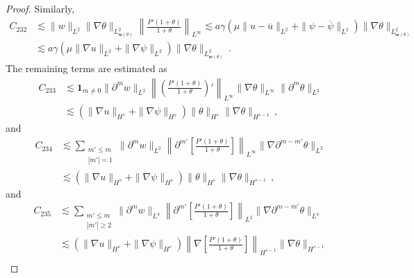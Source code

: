 \documentclass[10pt,a4paper]{amsart}
\def\w{\mathfrak{w}}
\begin{document}
\begin{proof}
Similarly,
\begin{equation}\label{gpsi-eq13}
\begin{aligned}
C_{232}&\lesssim \| w \|_{L^2} \| \nabla \theta \|_{L^2_{\w (\theta)}} \left\| \frac{P'(1+\theta)}{1+\theta} \right\|_{L^\infty} \lesssim a \gamma \left( \mu \| u - \overline{u} \|_{L^2} + \| \psi - \overline{\psi} \|_{L^2} \right) \| \nabla \theta \|_{L^2_{\w (\theta)}} \\&
\lesssim a \gamma \left( \mu \| \nabla u \|_{L^2} + \| \nabla \psi \|_{L^2} \right) \| \nabla \theta \|_{L^2_{\w (\theta)}} \,.
\end{aligned}
\end{equation}
The remaining terms are estimated as
\begin{equation}\label{gpsi-eq14}
\begin{aligned}
C_{233}&\lesssim\mathbf{1}_{m \neq 0} \|\partial^m w\|_{L^2} \left\| \left( \frac{P'(1+\theta)}{1+\theta} \right)' \right\|_{L^\infty}\|\nabla \theta\|_{L^\infty}\|\partial^m \theta\|_{L^2} \\
&\lesssim \left( \|\nabla u\|_{H^s} + \|\nabla \psi\|_{H^s} \right) \|\theta\|_{H^s} \|\nabla \theta\|_{H^{s-1}}
 \,,
\end{aligned}
\end{equation}
and
\begin{equation}\label{gpsi-eq15}
\begin{aligned}
C_{234}&\lesssim \sum_{\substack{m' \leq m \\ |m'|=1}} \|\partial^m w\|_{L^2} \left\| \partial^{m'} \left[ \frac{P'(1+\theta)}{1+\theta} \right] \right\|_{L^\infty} \|\nabla \partial^{m-m'} \theta\|_{L^2} \\
&\lesssim \left( \|\nabla u\|_{H^s} + \|\nabla \psi\|_{H^s} \right) \|\theta\|_{H^s} \|\nabla \theta\|_{H^{s-1}}
 \,,
\end{aligned}
\end{equation}
and
\begin{equation}\label{gpsi-eq16}
\begin{aligned}
C_{235}&\lesssim \sum_{\substack{m' \leq m \\ |m'|\geq 2}} \|\partial^m w\|_{L^4} \left\| \partial^{m'} \left[ \frac{P'(1+\theta)}{1+\theta} \right] \right\|_{L^2} \|\nabla \partial^{m-m'} \theta\|_{L^4} \\
&\lesssim \left( \|\nabla u\|_{H^s} + \|\nabla \psi\|_{H^s} \right) \left\| \nabla \left[ \frac{P'(1+\theta)}{1+\theta} \right] \right\|_{H^{s-1}} \|\nabla \theta\|_{H^{s-1}} \\

\end{aligned}
\end{equation}
\end{proof}
\end{document}
